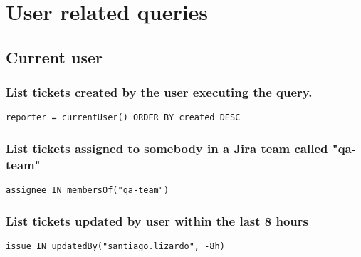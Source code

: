 \newpage
\section{User related queries}

\subsection{Current user}

\subsubsection*{List tickets created by the user executing the query.}

\begin{small}
    \begin{lstlisting}[language=jql]
    reporter = currentUser() ORDER BY created DESC
\end{lstlisting}
\end{small}

\subsubsection*{List tickets assigned to somebody in a Jira team called "qa-team"}

\begin{small}
    \begin{lstlisting}[language=jql]
        assignee IN membersOf("qa-team")
    \end{lstlisting}
\end{small}

\subsubsection*{List tickets updated by user within the last 8 hours}

\begin{small}
    \begin{lstlisting}[language=jql]
        issue IN updatedBy("santiago.lizardo", -8h)
    \end{lstlisting}
\end{small}

 